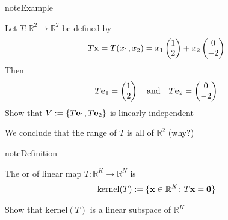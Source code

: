 \documentclass[letterpaper,10pt,english]{jupyterBook}
\begin{document}
\begin{sphinxadmonition}{note}{Example}

\sphinxAtStartPar
Let \(T \colon \mathbb{R}^2 \to \mathbb{R}^2\) be defined by
\begin{equation*}
\begin{split}
%
T{\bf x} 
=
T(x_1, x_2)
=
x_1 
\begin{pmatrix}
1 \\
2
\end{pmatrix}
+
x_2 
\begin{pmatrix}
0 \\
-2
\end{pmatrix}
%
\end{split}
\end{equation*}
\sphinxAtStartPar
Then
\begin{equation*}
\begin{split}
%
T{\bf e}_1
=
\begin{pmatrix}
1 \\
2
\end{pmatrix}
\quad \text{and} \quad
T{\bf e}_2
=
\begin{pmatrix}
0 \\
-2
\end{pmatrix}
%
\end{split}
\end{equation*}
\sphinxAtStartPar
{} Show that \(V := \{T{\bf e}_1, T{\bf e}_2\}\) is linearly independent

\sphinxAtStartPar
We conclude that the range of \(T\) is all of \(\mathbb{R}^2\) (why?)
\end{sphinxadmonition}

\begin{sphinxadmonition}{note}{Definition}

\sphinxAtStartPar
The  or  of linear map \(T \colon \mathbb{R}^K \to
\mathbb{R}^N\) is
\begin{equation*}
\begin{split}
%
\mathrm{kernel}(T) := \{ {\bf x} \in \mathbb{R}^K \colon T{\bf x} = {\bf 0}\}
%
\end{split}
\end{equation*}\end{sphinxadmonition}

\sphinxAtStartPar
{} Show that \(\mathrm{kernel}(T)\) is a linear subspace of \(\mathbb{R}^K\)
\end{document}
